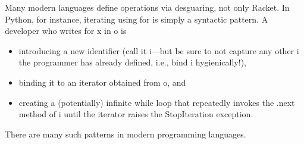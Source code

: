 
Many modern languages define operations via desguaring, not only Racket. In
Python, for instance, iterating using for is simply a syntactic pattern. A
developer who writes for x in o is
\begin{itemize}
  \item 
introducing a new identifier (call it i—but be sure to not capture any other i
the programmer has already defined, i.e., bind i hygienically!),
  \item 
binding it to an iterator obtained from o, and
  \item 
creating a (potentially) infinite while loop that repeatedly invokes the .next
method of i until the iterator raises the StopIteration exception.
\end{itemize}
There are many such patterns in modern programming languages.
